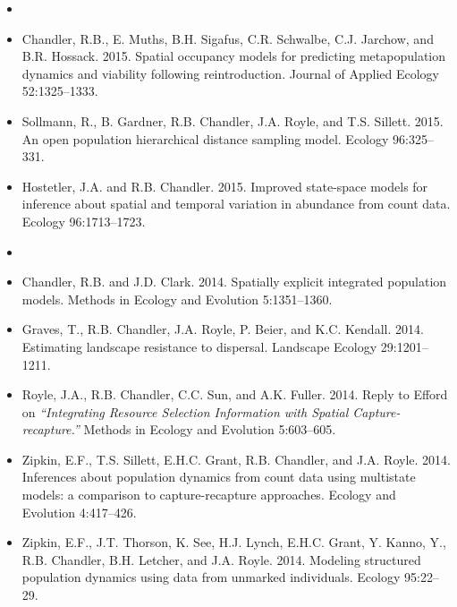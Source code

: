 \documentclass[12pt]{article}
\begin{document}
\begin{itemize}

\item[] { \\}

\item Chandler, R.B., E. Muths, B.H. Sigafus, C.R. Schwalbe,
  C.J. Jarchow, and B.R. Hossack. 2015. Spatial occupancy models for
  predicting metapopulation dynamics and viability following
  reintroduction. Journal of Applied Ecology 52:1325--1333.

\item Sollmann, R., B. Gardner, R.B. Chandler, J.A. Royle, and
  T.S. Sillett. 2015. An open population hierarchical
  distance sampling model. Ecology 96:325--331.

\item Hostetler, J.A. and R.B. Chandler. 2015. Improved
  state-space models for inference about spatial and temporal
  variation in abundance from count data. Ecology 96:1713--1723.

\item[] { \\}

\item Chandler, R.B. and J.D. Clark. 2014. Spatially
  explicit integrated population models. Methods in Ecology and
  Evolution 5:1351--1360.

\item Graves, T., R.B. Chandler, J.A. Royle, P. Beier, and
  K.C. Kendall. 2014. Estimating landscape resistance to
  dispersal. Landscape Ecology 29:1201--1211.

\item Royle, J.A., R.B. Chandler, C.C. Sun, and A.K. Fuller. 2014. 
  Reply to Efford on   {\it ``Integrating Resource Selection
    Information with Spatial Capture-recapture.''} Methods in Ecology
  and Evolution 5:603--605. 

\item Zipkin, E.F., T.S. Sillett, E.H.C. Grant, R.B. Chandler, and
  J.A. Royle. 2014. Inferences about population dynamics
  from count data using multistate models: a comparison to
  capture-recapture approaches. Ecology and Evolution 4:417--426.

\item Zipkin, E.F., J.T. Thorson, K. See, H.J. Lynch, E.H.C. Grant,
  Y. Kanno, Y., R.B. Chandler, B.H. Letcher, and J.A. Royle.
  2014. Modeling structured population dynamics using
  data from unmarked individuals. Ecology 95:22--29.


\end{itemize}
\end{document}
